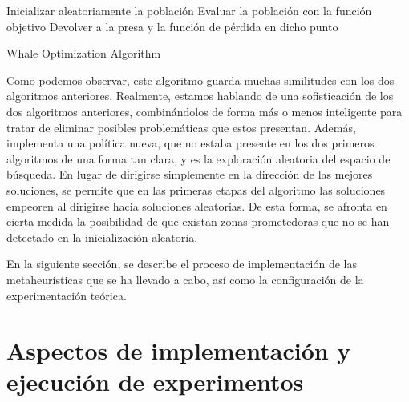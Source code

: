 \documentclass[
  a4paper,
,tablecaptionabove
]{scrartcl}
\begin{document}
\begin{algorithm}[H]
\DontPrintSemicolon
\SetAlgoLined
\BlankLine
    Inicializar aleatoriamente la población\;
    Evaluar la población con la función objetivo\;
    Devolver a la presa y la función de pérdida en dicho punto\;
\caption{Whale Optimization Algorithm}
\end{algorithm}

Como podemos observar, este algoritmo guarda muchas similitudes con los
dos algoritmos anteriores. Realmente, estamos hablando de una
sofisticación de los dos algoritmos anteriores, combinándolos de forma
más o menos inteligente para tratar de eliminar posibles problemáticas
que estos presentan. Además, implementa una política nueva, que no
estaba presente en los dos primeros algoritmos de una forma tan clara, y
es la exploración aleatoria del espacio de búsqueda. En lugar de
dirigirse simplemente en la dirección de las mejores soluciones, se
permite que en las primeras etapas del algoritmo las soluciones empeoren
al dirigirse hacia soluciones aleatorias. De esta forma, se afronta en
cierta medida la posibilidad de que existan zonas prometedoras que no se
han detectado en la inicialización aleatoria.

En la siguiente sección, se describe el proceso de implementación de las
metaheurísticas que se ha llevado a cabo, así como la configuración de
la experimentación teórica.

\hypertarget{aspectos-de-implementaciuxf3n-y-ejecuciuxf3n-de-experimentos}{%
\section{Aspectos de implementación y ejecución de
experimentos}\label{aspectos-de-implementaciuxf3n-y-ejecuciuxf3n-de-experimentos}}
\end{document}
